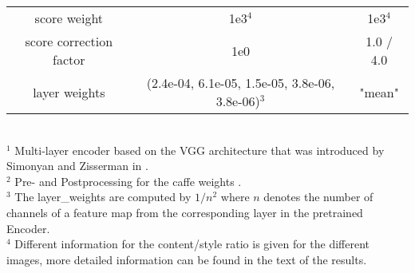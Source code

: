 \begin{landscape}
\begin{table*}[!t]
\begin{tabular}{c|c|c}
		score weight & 1e3$^4$ & 1e3$^4$ \\
		score correction factor & 1e0 & 1.0 / 4.0 \\
		layer weights & (2.4e-04, 6.1e-05, 1.5e-05, 3.8e-06, 3.8e-06)$^3$ & "mean" \\
		\hline
	\end{tabular}
\raggedright
	\footnotesize{
		\\$^1$ Multi-layer encoder based on the VGG architecture that was introduced by
		Simonyan and Zisserman in \cite{SZ2015}.
	    \\$^2$ Pre- and Postprocessing for the caffe weights \cite{SZ2015}.
        \\$^3$ The layer\_weights are computed by $1/n^2$ where $n$ denotes the number of channels of a feature map from the corresponding layer in the pretrained Encoder.
        \\$^4$ Different information for the content/style ratio is given for the different images, more detailed information can be found in the text of the results.
    }
\end{table*}
\end{landscape}


